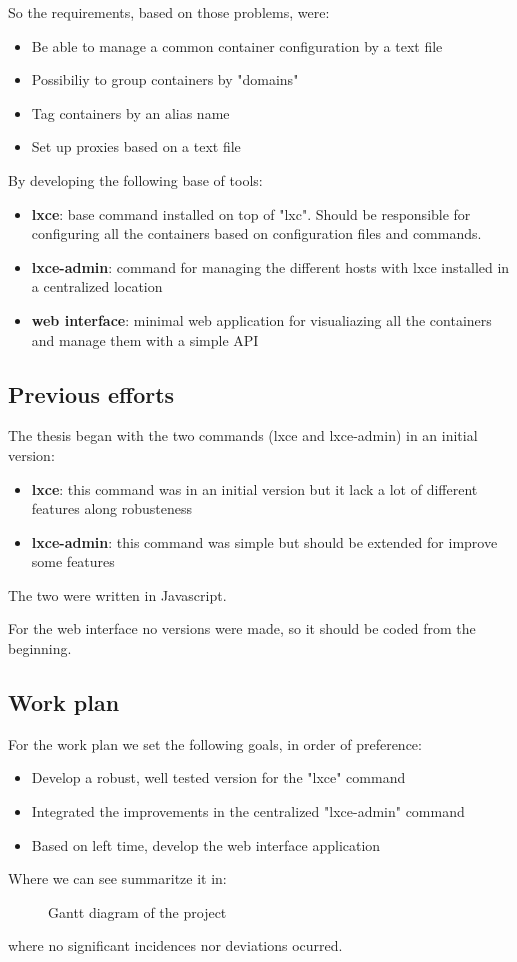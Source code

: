 So the requirements, based on those problems, were:
\begin{itemize}
	\item {Be able to manage a common container configuration by a text file}
	\item {Possibiliy to group containers by "domains"}
	\item {Tag containers by an alias name}
	\item {Set up proxies based on a text file}
\end{itemize}

By developing the following base of tools:
\begin{itemize}
	\item {\textbf{lxce}: base command installed on top of "lxc". Should be responsible for configuring all the containers based on configuration files and commands.}
	\item {\textbf{lxce-admin}: command for managing the different hosts with lxce installed in a centralized location}
	\item {\textbf{web interface}: minimal web application for visualiazing all the containers and manage them with a simple API}
\end{itemize}


\subsection{Previous efforts}
\label{ssec:previous}
The thesis began with the two commands (lxce and lxce-admin) in an initial version:
\begin{itemize}
	\item {\textbf{lxce}: this command was in an initial version but it lack a lot of different features along robusteness}
	\item {\textbf{lxce-admin}: this command was simple but should be extended for improve some features}
\end{itemize}
The two were written in Javascript.

For the web interface no versions were made, so it should be coded from the beginning.

\subsection{Work plan}
\label{ssec:gantt}
For the work plan we set the following goals, in order of preference:
\begin{itemize}
	\item {Develop a robust, well tested version for the "lxce" command}
	\item {Integrated the improvements in the centralized "lxce-admin" command}
	\item {Based on left time, develop the web interface application}
\end{itemize}

\newpage
Where we can see summaritze it in:
\begin{figure}[H]
    
    \caption[Project's Gantt diagram]{\footnotesize{Gantt diagram of the project}}
    \label{fig:gantt}
\end{figure}
where no significant incidences nor deviations ocurred.
\bigskip

